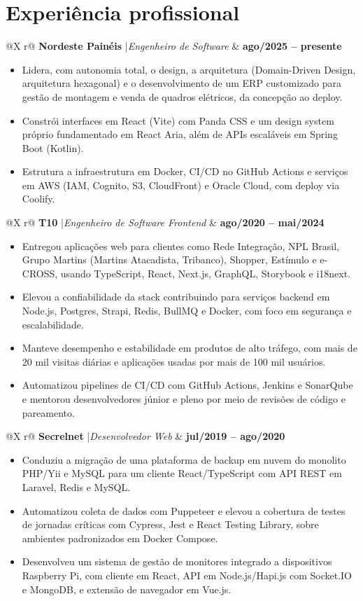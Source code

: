 \documentclass[a4paper,10pt]{article}
\makeatletter
\newcommand{\cvrole}[4]{%
  \begin{tabularx}{\linewidth}{@{}X r@{}}
    \textbf{#1} \enspace|\enspace \textit{#2} & \textbf{#3} \\
    \multicolumn{2}{@{}l@{}}{\textit{#4}}
  \end{tabularx}\vspace{-5pt}
}
\makeatother
\begin{document}
\section{Experi\^encia profissional}
\cvrole{Nordeste Pain\'eis}{Engenheiro de Software}{ago/2025 -- presente}{H\'ibrido}
\begin{itemize}
  \item Lidera, com autonomia total, o design, a arquitetura (Domain-Driven Design, arquitetura hexagonal) e o desenvolvimento de um ERP customizado para gest\~ao de montagem e venda de quadros el\'etricos, da concep\c{c}\~ao ao deploy.
  \item Constr\'oi interfaces em React (Vite) com Panda CSS e um design system pr\'oprio fundamentado em React Aria, al\'em de APIs escal\'aveis em Spring Boot (Kotlin).
  \item Estrutura a infraestrutura em Docker, CI/CD no GitHub Actions e servi\c{c}os em AWS (IAM, Cognito, S3, CloudFront) e Oracle Cloud, com deploy via Coolify.
\end{itemize}

\cvrole{T10}{Engenheiro de Software Frontend}{ago/2020 -- mai/2024}{Remoto}
\begin{itemize}
  \item Entregou aplica\c{c}\~oes web para clientes como Rede Integra\c{c}\~ao, NPL Brasil, Grupo Martins (Martins Atacadista, Tribanco), Shopper, Est\'imulo e e-CROSS, usando TypeScript, React, Next.js, GraphQL, Storybook e i18next.
  \item Elevou a confiabilidade da stack contribuindo para servi\c{c}os backend em Node.js, Postgres, Strapi, Redis, BullMQ e Docker, com foco em seguran\c{c}a e escalabilidade.
  \item Manteve desempenho e estabilidade em produtos de alto tr\'afego, com mais de 20 mil visitas di\'arias e aplica\c{c}\~oes usadas por mais de 100 mil usu\'arios.
  \item Automatizou pipelines de CI/CD com GitHub Actions, Jenkins e SonarQube e mentorou desenvolvedores j\'unior e pleno por meio de revis\~oes de c\'odigo e pareamento.
\end{itemize}

\cvrole{Secrelnet}{Desenvolvedor Web}{jul/2019 -- ago/2020}{Presencial}
\begin{itemize}
  \item Conduziu a migra\c{c}\~ao de uma plataforma de backup em nuvem do monolito PHP/Yii e MySQL para um cliente React/TypeScript com API REST em Laravel, Redis e MySQL.
  \item Automatizou coleta de dados com Puppeteer e elevou a cobertura de testes de jornadas cr\'iticas com Cypress, Jest e React Testing Library, sobre ambientes padronizados em Docker Compose.
  \item Desenvolveu um sistema de gest\~ao de monitores integrado a dispositivos Raspberry Pi, com cliente em React, API em Node.js/Hapi.js com Socket.IO e MongoDB, e extens\~ao de navegador em Vue.js.
\end{itemize}
\end{document}
